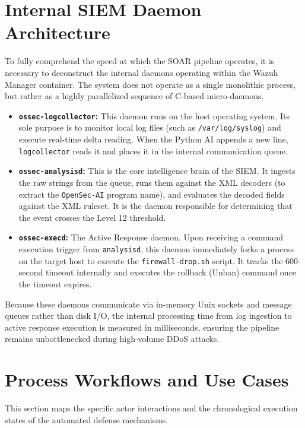 \documentclass[12pt, a4paper]{report}
\begin{document}
	\section{Internal SIEM Daemon Architecture}
	To fully comprehend the speed at which the SOAR pipeline operates, it is necessary to deconstruct the internal daemons operating within the Wazuh Manager container. The system does not operate as a single monolithic process, but rather as a highly parallelized sequence of C-based micro-daemons.
	
	\begin{itemize}
		\item \textbf{\texttt{ossec-logcollector}:} This daemon runs on the host operating system. Its sole purpose is to monitor local log files (such as \texttt{/var/log/syslog}) and execute real-time delta reading. When the Python AI appends a new line, \texttt{logcollector} reads it and places it in the internal communication queue.
		
		\item \textbf{\texttt{ossec-analysisd}:} This is the core intelligence brain of the SIEM. It ingests the raw strings from the queue, runs them against the XML decoders (to extract the \texttt{OpenSec-AI} program name), and evaluates the decoded fields against the XML ruleset. It is the daemon responsible for determining that the event crosses the Level 12 threshold.
		
		\item \textbf{\texttt{ossec-execd}:} The Active Response daemon. Upon receiving a command execution trigger from \texttt{analysisd}, this daemon immediately forks a process on the target host to execute the \texttt{firewall-drop.sh} script. It tracks the 600-second timeout internally and executes the rollback (Unban) command once the timeout expires.
	\end{itemize}
	
	Because these daemons communicate via in-memory Unix sockets and message queues rather than disk I/O, the internal processing time from log ingestion to active response execution is measured in milliseconds, ensuring the pipeline remains unbottlenecked during high-volume DDoS attacks.
	
	\newpage
	\section{Process Workflows and Use Cases}
	This section maps the specific actor interactions and the chronological execution states of the automated defense mechanisms.
	
\end{document}
